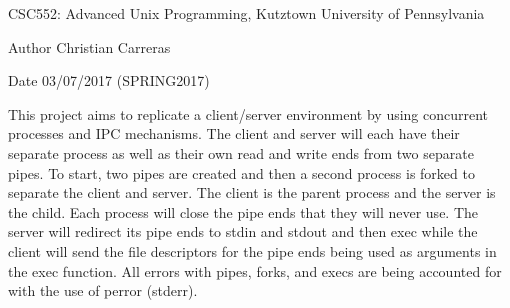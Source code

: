 CSC552: Advanced Unix Programming, Kutztown University of Pennsylvania \begin{DoxyAuthor}{Author}
Christian Carreras 
\end{DoxyAuthor}
\begin{DoxyDate}{Date}
03/07/2017 (SPRING2017)
\end{DoxyDate}
This project aims to replicate a client/server environment by using concurrent processes and IPC mechanisms. The client and server will each have their separate process as well as their own read and write ends from two separate pipes. To start, two pipes are created and then a second process is forked to separate the client and server. The client is the parent process and the server is the child. Each process will close the pipe ends that they will never use. The server will redirect its pipe ends to stdin and stdout and then exec while the client will send the file descriptors for the pipe ends being used as arguments in the exec function. All errors with pipes, forks, and execs are being accounted for with the use of perror (stderr). 